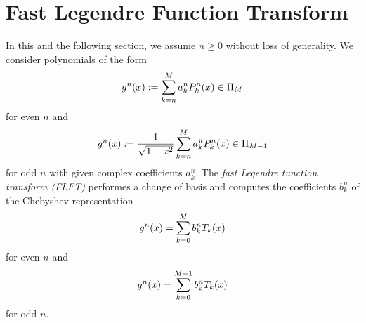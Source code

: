 

\section{Fast Legendre Function Transform}
\label{DSFT:FLFT}

In this and the following section, we assume $n \ge 0$ without loss of generality. We consider polynomials of the form
\begin{equation}
  \label{NFSFT:GnEven}
 g^n{\hspace{-0.4ex}}\left(x\right) := \sum_{k=n}^M a_k^n P_k^n{\hspace{-0.4ex}}\left(x\right) \in \Pi_M
 \end{equation}
for even $n$ and
\begin{equation}
  \label{NFSFT:GnOdd}
  g^n{\hspace{-0.4ex}}\left(x\right) := \frac{1}{\sqrt{1-x^2}} \sum_{k=n}^M a_k^n P_k^n{\hspace{-0.4ex}}\left(x\right) \in \Pi_{M-1}
\end{equation}
for odd $n$ with given complex coefficients $a_k^n$.
The \emph{fast Legendre tunction transform (FLFT)} performes a change of basis and computes the 
coefficients $b_k^n$ of the Chebyshev representation
$$ g^n{\hspace{-0.4ex}}\left(x\right) = \sum_{k=0}^M b_k^n T_k{\hspace{-0.4ex}}\left(x\right)$$
for even $n$ and
$$g^n{\hspace{-0.4ex}}\left(x\right) = \sum_{k=0}^{M-1} b_k^n T_k{\hspace{-0.4ex}}\left(x\right)$$
for odd $n$.

